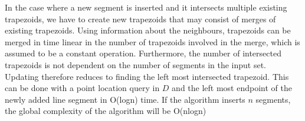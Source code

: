 In the case where a new segment is inserted and it intersects multiple existing trapezoids, we have to create new trapezoids that may consist of merges of existing trapezoids. Using information about the neighbours, trapezoids can be merged in time linear in the number of trapezoids involved in the merge, which is assumed to be a constant operation. Furthermore,  the number of intersected trapezoids is not dependent on the number of segments in the input set. Updating therefore reduces to finding the left most intersected trapezoid. This can be done with a point location query in $D$ and the left most endpoint of the newly added line segment in O(logn) time. If the algorithm inserts $n$ segments, the global complexity of the algorithm will be O(nlogn)